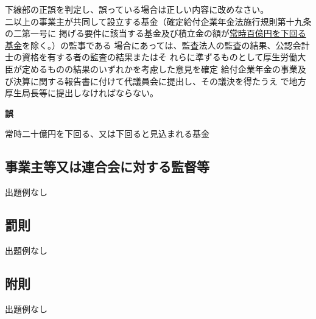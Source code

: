 \begin{truefalse}
  下線部の正誤を判定し、誤っている場合は正しい内容に改めなさい。
  \\   

  二以上の事業主が共同して設立する基金（確定給付企業年金法施行規則第十九条の二第一号に
掲げる要件に該当する基金及び積立金の額が\underline{常時百億円を下回る基金}を除く。）の監事である
場合にあっては、監査法人の監査の結果、公認会計士の資格を有する者の監査の結果またはそ
れらに準ずるものとして厚生労働大臣が定めるものの結果のいずれかを考慮した意見を確定
給付企業年金の事業及び決算に関する報告書に付けて代議員会に提出し、その議決を得たうえ
で地方厚生局長等に提出しなければならない。
\end{truefalse}

\begin{answerbox}
  \textbf{誤}

  常時二十億円を下回る、又は下回ると見込まれる基金
\end{answerbox}

\newpage

\subsection{事業主等又は連合会に対する監督等}


出題例なし

\newpage

\subsection{罰則}


出題例なし

\newpage

\subsection{附則}

出題例なし

\newpage